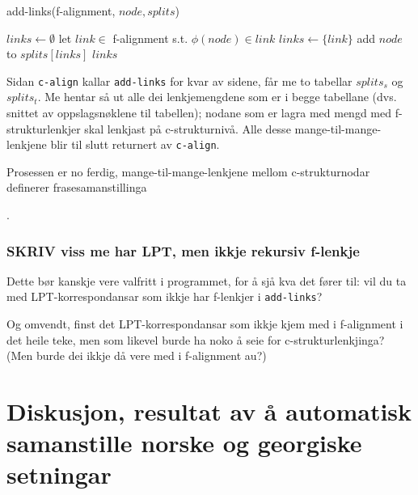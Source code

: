 \documentclass[11pt,a4paper,oneside,draft]{book}
\begin{document}
   \begin{algorithm}[]
   \caption{add-links(f-alignment, $node, splits$)}
   \label{algo:add-links}
      
        $links \gets \emptyset$\;
    {
        {
          let $link \in$ f-alignment s.t. $\phi(node) \in link$ \;
           {$links \gets \{link\}$}
        }
        add $node$ to $splits[links]$ \;
       }
        \Return $links$ \;
  \end{algorithm}

Sidan \texttt{c-align} kallar \texttt{add-links} for kvar av sidene, får me to
tabellar $splits_s$ og $splits_t$. Me hentar så ut alle dei
lenkjemengdene som er i begge tabellane (dvs. snittet av oppslagsnøklene
til tabellen); nodane som er lagra med mengd med f-strukturlenkjer
skal lenkjast på c-strukturnivå. Alle desse mange-til-mange-lenkjene
blir til slutt returnert av \texttt{c-align}.

Prosessen er no ferdig, mange-til-mange-lenkjene mellom
c-strukturnodar definerer frasesamanstillinga

.


\subsection{\textbf{SKRIV} viss me har LPT, men ikkje rekursiv f-lenkje}
\label{sec-4.3.1}

    Dette bør kanskje vere valfritt i programmet, for å sjå kva det
    fører til: vil du ta med LPT-korrespondansar som ikkje har
    f-lenkjer i \texttt{add-links}?

    Og omvendt, finst det LPT-korrespondansar som ikkje kjem med i
    f-alignment i det heile teke, men som likevel burde ha noko å seie
    for c-strukturlenkjinga? (Men burde dei ikkje då vere med i
    f-alignment au?)



\chapter{Diskusjon, resultat av å automatisk samanstille norske og georgiske setningar}
\label{sec-5}
\end{document}
